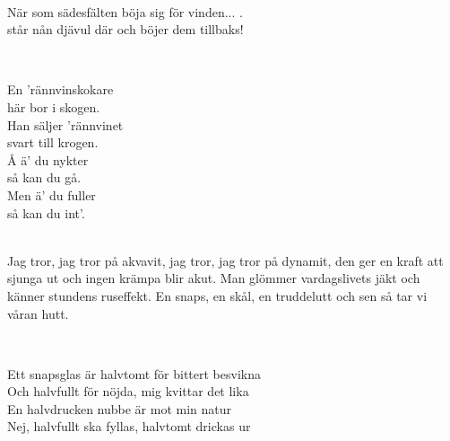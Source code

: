 
 \\       

\songtext{}När som sädesfälten böja sig för vinden... .\\
står nån djävul där och böjer dem tillbaks! 



 \\       
\author{Text: Lars T. Johansson, Ehrling Eliasson }

\songtext{}En 'rännvinskokare \\
här bor i skogen. \\
Han säljer 'rännvinet \\
svart till krogen. \\
Å ä' du nykter \\
så kan du gå. \\
Men ä' du fuller \\
så kan du int'. \\


 \\       

\songtext{}
Jag tror, jag tror på akvavit,
jag tror, jag tror på dynamit,
den ger en kraft att sjunga ut
och ingen krämpa blir akut.
Man glömmer vardagslivets jäkt
och känner stundens ruseffekt. 
En snaps, en skål, en truddelutt 
och sen så tar vi våran hutt.

\newpage 


 \\       
\author{Text: Quiz och Jacke}

\songtext{}
Ett snapsglas är halvtomt för bittert besvikna \\
Och halvfullt för nöjda, mig kvittar det lika \\
En halvdrucken nubbe är mot min natur \\
Nej, halvfullt ska fyllas, halvtomt drickas ur 

 \\



